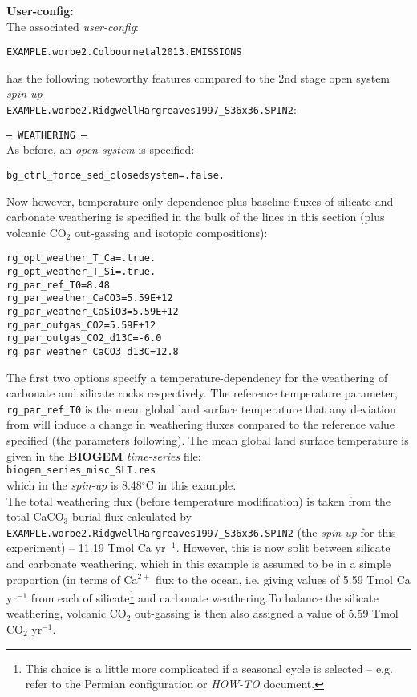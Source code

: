 \documentclass[10pt,twoside]{article}
\begin{document}
\noindent \textbf{User-config:} 
\\ The associated \textit{user-config}:
\vspace{-10pt}\begin{verbatim}EXAMPLE.worbe2.Colbournetal2013.EMISSIONS\end{verbatim}\vspace{-10pt}
has the following noteworthy features compared to the 2nd stage open system \textit{spin-up}
\\ \texttt{EXAMPLE.worbe2.RidgwellHargreaves1997\_S36x36.SPIN2}:

\begin{compactitem}
                \item \texttt{--- WEATHERING ---}
                \\ As before, an \textit{open  system} is specified:
\vspace{-5pt}\begin{verbatim}
bg_ctrl_force_sed_closedsystem=.false.
                \end{verbatim}\vspace{-5pt}
                Now however, temperature-only dependence plus baseline fluxes of silicate and carbonate weathering is specified in the bulk of the lines in this section (plus volcanic CO$_{2}$ out-gassing and isotopic compositions):
\vspace{-5pt}\begin{verbatim}
rg_opt_weather_T_Ca=.true.
rg_opt_weather_T_Si=.true.
rg_par_ref_T0=8.48
rg_par_weather_CaCO3=5.59E+12
rg_par_weather_CaSiO3=5.59E+12 
rg_par_outgas_CO2=5.59E+12
rg_par_outgas_CO2_d13C=-6.0
rg_par_weather_CaCO3_d13C=12.8
                \end{verbatim}\vspace{-5pt}
The first two options specify a temperature-dependency for the weathering of carbonate and silicate rocks respectively. The reference temperature parameter, \texttt{rg\_par\_ref\_T0} is the mean global land surface temperature that any deviation from will induce a change in weathering fluxes compared to the reference value specified (the parameters following). The mean global land surface temperature is given in the \textbf{BIOGEM} \textit{time-series} file:
\\\texttt{biogem\_series\_misc\_SLT.res}
\\which in the \textit{spin-up} is 8.48$^{\circ}$C in this example.
\\The total weathering flux (before temperature modification) is taken from the total CaCO$_{3}$ burial flux calculated by \texttt{EXAMPLE.worbe2.RidgwellHargreaves1997\_S36x36.SPIN2} (the \textit{spin-up} for this experiment) -- 11.19 Tmol Ca yr$^{-1}$. However, this is now split between silicate and carbonate weathering, which in this example is assumed to be in a simple proportion (in terms of Ca$^{2+}$ flux to the ocean, i.e. giving values of 5.59 Tmol Ca yr$^{-1}$ from each of silicate\footnote{This choice is a little more complicated if a seasonal cycle is selected -- e.g. refer to the Permian configuration or \textit{HOW-TO} document.} and carbonate weathering.To balance the silicate weathering, volcanic CO$_{2}$ out-gassing is then also assigned a value of 5.59 Tmol CO$_{2}$ yr$^{-1}$.

\end{compactitem}
\end{document}
